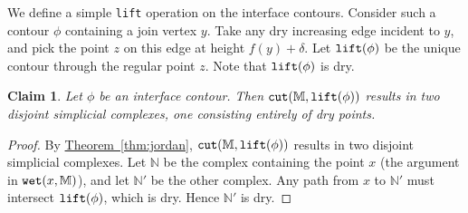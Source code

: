 \documentclass[11pt]{article}
\newtheorem{claim}[theorem]{Claim}
\theoremstyle{definition}
\newcommand{\MM}{\mathbb{M}}
\newcommand{\NN}{\mathbb{N}}
\newcommand{\Thm}[1]{\hyperref[thm:#1]{Theorem~\ref*{thm:#1}}} %
\newcommand{\cut}{{\tt cut}}
\newcommand{\lift}{{\tt lift}}
\newcommand{\wet}{{\tt wet}}
\begin{document}
% 
% 

We define a simple \lift{} operation on the interface contours. Consider such a contour $\phi$ containing
a join vertex $y$. Take any dry increasing edge incident to $y$, and pick the point $z$ on this edge at height
$f(y) + \delta$. Let $\lift(\phi)$ be the unique contour through the regular point $z$. Note that $\lift(\phi)$ is dry.

\begin{claim} \label{clm:cut-int} Let $\phi$ be an interface contour. Then $\cut(\MM,\lift(\phi))$
results in two disjoint simplicial complexes, one consisting entirely of dry points.
\end{claim}

\begin{proof} By \Thm{jordan}, $\cut(\MM,\lift(\phi))$ results in two disjoint simplicial complexes. Let $\NN$ be the complex containing
the point $x$ (the argument in $\wet(x,\MM)$), and let $\NN'$ be the other complex. 
Any path from $x$ to $\NN'$ must intersect $\lift(\phi)$, which is dry. Hence $\NN'$ is dry.
%
%
\end{proof}
\end{document}
